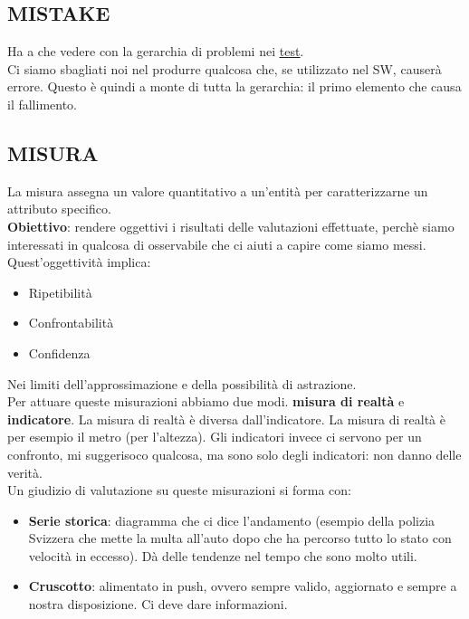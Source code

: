 		\subsection{MISTAKE}		\label{mistake}
		Ha a che vedere con la gerarchia di problemi nei \underline{\hyperref[test]{test}}. \\
		Ci siamo sbagliati noi nel produrre qualcosa che, se utilizzato  nel SW, causerà errore. Questo è quindi a monte di tutta la gerarchia: il primo elemento che causa il fallimento.

		\subsection{MISURA}	 \label{misura}
		La misura assegna un valore quantitativo a un'entità per caratterizzarne un attributo specifico. \\
		\textbf{Obiettivo}: rendere oggettivi i risultati delle valutazioni effettuate, perchè siamo interessati in qualcosa di osservabile che ci aiuti a capire come siamo messi. \\
		Quest'oggettività implica:
		\begin{itemize}
			\item Ripetibilità
			\item Confrontabilità
			\item Confidenza
		\end{itemize}
		Nei limiti dell'approssimazione e della possibilità di astrazione. \\
		Per attuare queste misurazioni abbiamo due modi. \textbf{misura di realtà} e \textbf{indicatore}.
		La misura di realtà è diversa dall'indicatore.
		La misura di realtà è per esempio il metro (per l'altezza).
		Gli indicatori invece ci servono per un confronto, mi suggerisoco qualcosa, ma sono solo degli indicatori: non danno delle verità. \\
		Un giudizio di valutazione su queste misurazioni si forma con: %
		\begin{itemize}
			\item \textbf{Serie storica}: diagramma che ci dice l'andamento (esempio della polizia Svizzera che mette la multa all'auto dopo che ha percorso tutto lo stato con velocità in eccesso). Dà delle tendenze nel tempo che sono molto utili.
			\item \textbf{Cruscotto}: alimentato in push, ovvero sempre valido, aggiornato e sempre a nostra disposizione. Ci deve dare informazioni.
		\end{itemize}


